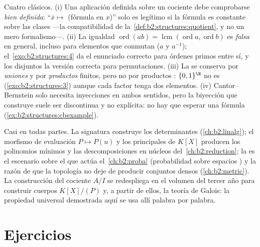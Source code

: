 \begin{remark}\label{rem:b2:structures:pitfalls}
Cuatro clásicos. (i) Una aplicación definida sobre un cociente debe
comprobarse \emph{bien definida}: ``$\overline x \mapsto$ (fórmula
en $x$)'' solo es legítimo si la fórmula es constante sobre las
clases ---la compatibilidad de la~\cref{def:b2:structures:quotient}, y no un mero formalismo---. (ii)
La igualdad $\operatorname{ord}(ab) =
\operatorname{lcm}(\operatorname{ord}a, \operatorname{ord}b)$ es
\emph{falsa} en general, incluso para elementos que conmutan ($a$ y
$a^{-1}$); el~\cref{exo:b2:structures:4} da el enunciado correcto
para órdenes primos entre sí, y los  disjuntos la versión
correcta para permutaciones. (iii) La  se conserva por
\emph{uniones}  y por \emph{productos} finitos, pero no por
productos : $\{0,1\}^{\N}$ no es 
(\cref{exo:b2:structures:3}) aunque cada factor tenga dos
elementos. (iv) Cantor--Bernstein solo necesita inyecciones en
ambos sentidos, pero la biyección que construye suele ser
discontinua y no explícita: no hay que esperar una fórmula
(\cref{ex:b2:structures:cbexample}).
\end{remark}

\begin{remark}
Casi en todas partes. La signatura construye los determinantes
(\cref{ch:b2:linalg}); el morfismo de evaluación $P \mapsto P(u)$ y
los  principales de $K[X]$ producen los polinomios mínimos y
las descomposiciones en núcleos del~\cref{ch:b2:reduction}; la
 es el escenario sobre el que actúa el~\cref{ch:b2:proba} (probabilidad sobre espacios ) y la razón
de que la topología no deje de producir conjuntos densos 
(\cref{ch:b2:metric}). La construcción del cociente $A/I$ se
redespliega en el volumen del tercer año para construir cuerpos
$K[X]/(P)$ y, a partir de ellos, la teoría de Galois: la propiedad
universal demostrada aquí se usa allí palabra por palabra.
\end{remark}

\section{Ejercicios}

